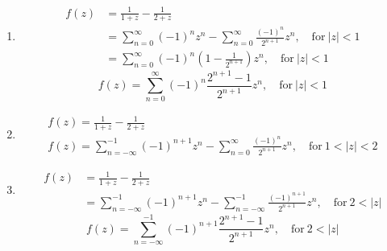{\begin{Solution}
  \begin{enumerate}
  \item
    \begin{align*}
      f(z)
      &= \frac{1}{1 + z} - \frac{1}{2 + z} 
      \\
      &= \sum_{n = 0}^\infty (-1)^n z^n - \sum_{n = 0}^\infty \frac{(-1)^n}{2^{n+1}} z^n,
      \quad \mathrm{for}\ |z| < 1 
      \\
      &= \sum_{n = 0}^\infty (-1)^n \left( 1 - \frac{1}{2^{n+1}} \right) z^n,
      \quad \mathrm{for}\ |z| < 1 
    \end{align*}
    \[
    \boxed{
      f(z) = \sum_{n = 0}^\infty (-1)^n \frac{2^{n+1} - 1}{2^{n+1}} z^n,
      \quad \mathrm{for}\ |z| < 1 
      }
    \]
  \item
    \begin{gather*}
      f(z) = \frac{1}{1 + z} - \frac{1}{2 + z} 
      \\
      \boxed{
        f(z) = \sum_{n = -\infty}^{-1} (-1)^{n+1} z^n - \sum_{n = 0}^\infty \frac{(-1)^n}{2^{n+1}} z^n, 
        \quad \mathrm{for}\ 1 < |z| < 2 
        }
    \end{gather*}
  \item
    \begin{align*}
      f(z)    
      &= \frac{1}{1 + z} - \frac{1}{2 + z} 
      \\
      &= \sum_{n = -\infty}^{-1} (-1)^{n+1} z^n - \sum_{n = -\infty}^{-1} \frac{(-1)^{n+1}}{2^{n+1}} z^n, 
      \quad \mathrm{for}\ 2 < |z| 
    \end{align*}
    \[
    \boxed{
      f(z) = \sum_{n = -\infty}^{-1} (-1)^{n+1} \frac{2^{n+1} - 1}{2^{n+1}} z^n,
      \quad \mathrm{for}\ 2 < |z| 
      }
    \]
  \end{enumerate}
\end{Solution}



}

